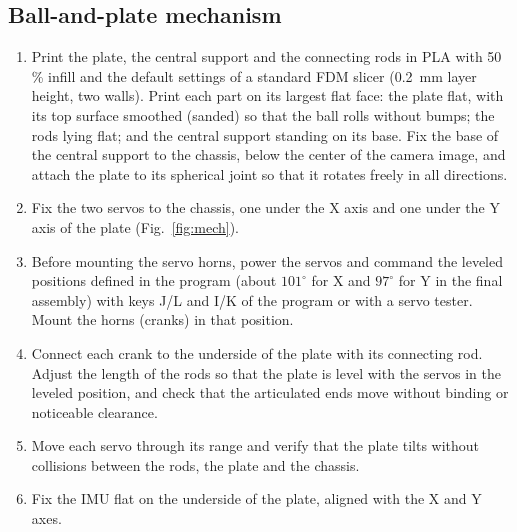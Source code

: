 \documentclass[11pt,letterpaper]{article}
\begin{document}
\subsection{Ball-and-plate mechanism}
\begin{enumerate}
    \item Print the plate, the central support and the connecting rods in
    PLA with 50\,\% infill and the default settings of a standard FDM
    slicer (0.2~mm layer height, two walls). Print each part on its
    largest flat face: the plate flat, with its top surface smoothed
    (sanded) so that the ball rolls without bumps; the rods lying flat;
    and the central support standing on its base. Fix the base of the central support to the chassis, below the
    center of the camera image, and attach the plate to its spherical
    joint so that it rotates freely in all directions.
    \item Fix the two servos to the chassis, one under the X axis and one
    under the Y axis of the plate (Fig.~\ref{fig:mech}).
    \item Before mounting the servo horns, power the servos and command
    the leveled positions defined in the program (about $101^\circ$ for
    X and $97^\circ$ for Y in the final assembly) with keys J/L and I/K of
    the program or with a servo tester. Mount the horns
    (cranks) in that position.
    \item Connect each crank to the underside of the plate with its
    connecting rod. Adjust the length of the rods so that the plate is
    level with the servos in the leveled position, and check that the
    articulated ends move without binding or noticeable clearance.
    \item Move each servo through its range and verify that the plate
    tilts without collisions between the rods, the plate and the chassis.
    \item Fix the IMU flat on the underside of the plate, aligned with
    the X and Y axes.
\end{enumerate}
\end{document}
